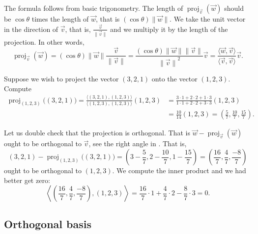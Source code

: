 The formula follows from basic trigonometry.  The length of
$\operatorname{proj}_{\vec{v}}(\vec{w})$ should be
$\cos \theta$ times the length of $\vec{w}$, that is $(\cos \theta)\lVert\vec{w}\rVert$.
We take the unit vector in the direction of $\vec{v}$, that is,
$\frac{\vec{v}}{\lVert \vec{v} \rVert}$ and we multiply it by the length of
the projection.  In other words,
\begin{equation*}
\operatorname{proj}_{\vec{v}}(\vec{w})
=
(\cos \theta) \lVert \vec{w} \rVert
\frac{\vec{v}}{\lVert \vec{v} \rVert}
=
\frac{(\cos \theta) \lVert \vec{w} \rVert \lVert \vec{v} \rVert}{
{\lVert \vec{v} \rVert}^2
}
\vec{v}
=
\frac{\langle \vec{w}, \vec{v} \rangle}{
\langle \vec{v}, \vec{v} \rangle
}
\vec{v} .
\end{equation*}

\begin{example}
Suppose we wish to project the vector $(3,2,1)$ onto the vector $(1,2,3)$.
Compute
\begin{equation*}
\begin{split}
\operatorname{proj}_{(1,2,3)} \bigl( (3,2,1) \bigr)
=
\frac{\langle (3,2,1) , (1,2,3) \rangle}{\langle (1,2,3) , (1,2,3) \rangle}
(1,2,3)
& =
\frac{3 \cdot 1 + 2 \cdot 2 + 1 \cdot 3}{ 1 \cdot 1 + 2 \cdot 2 + 3 \cdot 3}
(1,2,3)
\\
& =
\frac{10}{14}
(1,2,3)
=
\left(\frac{5}{7},\frac{10}{7},\frac{15}{7}\right) .
\end{split}
\end{equation*}

Let us double check that the projection is orthogonal.  That is
$\vec{w}-\operatorname{proj}_{\vec{v}}(\vec{w})$ ought to be orthogonal to
$\vec{v}$, see the right angle in .  That is,
\begin{equation*}
(3,2,1) - \operatorname{proj}_{(1,2,3)} \bigl( (3,2,1) \bigr)
=
\left(3-\frac{5}{7},2-\frac{10}{7},1-\frac{15}{7}\right)
=
\left(\frac{16}{7},\frac{4}{7},\frac{-8}{7}\right)
\end{equation*}
ought to be orthogonal to $(1,2,3)$.  We compute the inner product and we
had better get zero:
\begin{equation*}
\left\langle
\left(\frac{16}{7},\frac{4}{7},\frac{-8}{7}\right)
,
(1,2,3)
\right\rangle
=
\frac{16}{7} \cdot 1 + \frac{4}{7} \cdot 2 -\frac{8}{7} \cdot 3
=
0 .
\end{equation*}
\end{example}

\subsection{Orthogonal basis}

